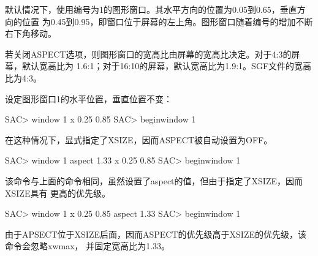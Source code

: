 默认情况下，使用编号为1的图形窗口。其水平方向的位置为0.05到0.65，垂直方向的位置
为0.45到0.95，即窗口位于屏幕的左上角。图形窗口随着编号的增加不断右下角移动。

若关闭ASPECT选项，则图形窗口的宽高比由屏幕的宽高比决定。对于4:3的屏幕，默认宽高比为
1.6:1；对于16:10的屏幕，默认宽高比为1.9:1。SGF文件的宽高比为4:3。

设定图形窗口1的水平位置，垂直位置不变：
\begin{SACCode}
SAC> window 1 x 0.25 0.85
SAC> beginwindow 1
\end{SACCode}
在这种情况下，显式指定了XSIZE，因而ASPECT被自动设置为OFF。

\begin{SACCode}
SAC> window 1 aspect 1.33 x 0.25 0.85
SAC> beginwindow 1
\end{SACCode}
该命令与上面的命令相同，虽然设置了aspect的值，但由于指定了XSIZE，因而XSIZE具有
更高的优先级。

\begin{SACCode}
SAC> window 1 x 0.25 0.85 aspect 1.33
SAC> beginwindow 1
\end{SACCode}
由于APSECT位于XSIZE后面，因而ASPECT的优先级高于XSIZE的优先级，该命令会忽略xwmax，
并固定宽高比为1.33。

